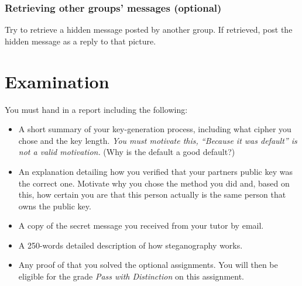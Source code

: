 \subsubsection{Retrieving other groups' messages (optional)}%
\label{subsec:Stegopt}

Try to retrieve a hidden message posted by another group.
If retrieved, post the hidden message as a reply to that picture.

% 
%
%


\section{Examination}%
\label{sec:Exam}

You must hand in a report including the following:
\begin{itemize}
  \item A short summary of your key-generation process, including what cipher 
    you chose and the key length.
    \emph{You must motivate this, ``Because it was default'' is not a valid 
    motivation.}
    (Why is the default a good default?)
  \item An explanation detailing how you verified that your partners public key 
    was the correct one.
    Motivate why you chose the method you did and, based on this, how certain 
    you are that this person actually is the same person that owns the public 
    key.
  \item A copy of the secret message you received from your tutor by email.
  \item A 250-words detailed description of how steganography works.
  \item Any proof of that you solved the optional assignments.
    You will then be eligible for the grade \emph{Pass with Distinction} on this 
    assignment.

\end{itemize}


\printbibliography{}

